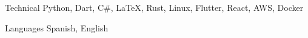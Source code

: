 
\begin{cvskills}

  \cvskill
    {Technical} %
    {Python, Dart, C\#, LaTeX, Rust, Linux, Flutter, React, AWS, Docker} %





  \cvskill
    {Languages} %
    {Spanish, English} %

\end{cvskills}
